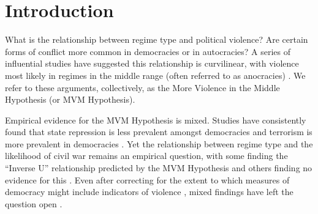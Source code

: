 \documentclass[titlepage, onecolumn,12pt]{article}
\begin{document}


\clearpage \doublespacing

\setcounter{page}{1}

\section{Introduction}

What is the relationship between regime type and political violence? Are certain forms of conflict more common in democracies or in autocracies? A series of influential studies have suggested this relationship is curvilinear, with violence most likely in regimes in the middle range (often referred to as anocracies) \citep{muller1985income,fein1995more,hegre2001toward,fearon2003ethnicity,eck2007one}. We refer to these arguments, collectively, as the More Violence in the Middle Hypothesis (or MVM Hypothesis).

Empirical evidence for the MVM Hypothesis is mixed. Studies have consistently found that state repression is less prevalent amongst democracies \citep{Davenport2007book} and terrorism is more prevalent in democracies \citep{chenoweth2010democratic}. Yet the relationship between regime type and the likelihood of civil war remains an empirical question, with some finding the ``Inverse U'' relationship predicted by the MVM Hypothesis \citep{hegre2001toward,fearon2003ethnicity} and others finding no evidence for this \citep{sambanis2001ethnic,cederman2010ethnic}. Even after correcting for the extent to which measures of democracy might include indicators of violence \citep{vreeland2008effect}, mixed findings have left the question open \citep{gleditsch2010political,peic2011foreign,koubi2014grievances}.
\end{document}
